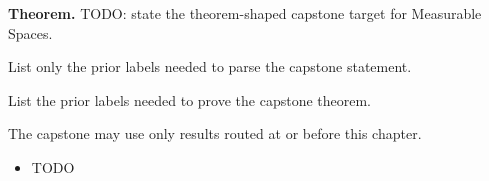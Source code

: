 \label{cap:measurable-spaces}

\begin{tcolorbox}[
  colback=gray!6,
  colframe=gray!40,
  arc=2pt,
  left=8pt, right=8pt, top=6pt, bottom=6pt,
  title={\small\textbf{Capstone Theorem}},
  fonttitle=\small\bfseries
]
\textbf{Theorem.}
TODO: state the theorem-shaped capstone target for Measurable Spaces.
\end{tcolorbox}

\begin{remark*}
List only the prior labels needed to parse the capstone statement.
\end{remark*}

\begin{remark*}
List the prior labels needed to prove the capstone theorem.
\end{remark*}

\begin{remark*}
The capstone may use only results routed at or before this chapter.
\end{remark*}

\begin{dependencies}
\begin{itemize}
  \item TODO
\end{itemize}
\end{dependencies}

\clearpage
